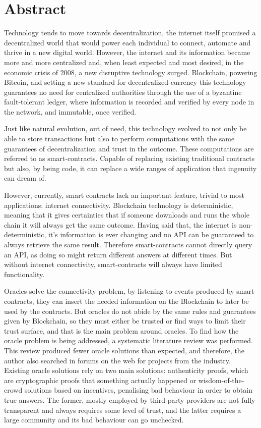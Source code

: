 \chapter*{Abstract}

Technology tends to move towards decentralization, the internet itself promised a decentralized world that would power each individual to connect, automate and thrive in a new digital world. However, the internet and its information became more and more centralized and, when least expected and most desired, in the economic crisis of 2008, a new disruptive technology surged. Blockchain, powering Bitcoin, and setting a new standard for decentralized-currency this technology guarantees no need for centralized authorities through the use of a byzantine fault-tolerant ledger, where information is recorded and verified by every node in the network, and immutable, once verified.

Just like natural evolution, out of need, this technology evolved to not only be able to store transactions but also to perform computations with the same guarantees of decentralization and trust in the outcome. These computations are referred to as smart-contracts. Capable of replacing existing traditional contracts but also, by being code, it can replace a wide ranges of application that ingenuity can dream of.

However, currently, smart contracts lack an important feature, trivial to most applications: internet connectivity. Blockchain technology is deterministic, meaning that it gives certainties that if someone downloads and runs the whole chain it will always get the same outcome. Having said that, the internet is non-deterministic, it's information is ever changing and no API can be guaranteed to always retrieve the same result. Therefore smart-contracts cannot directly query an API, as doing so might return different answers at different times. But without internet connectivity, smart-contracts will always have limited functionality.

Oracles solve the connectivity problem, by listening to events produced by smart-contracts, they can insert the needed information on the Blockchain to later be used by the contracts. But oracles do not abide by the same rules and guarantees given by Blockchain, so they must either be trusted or find ways to limit their trust surface, and that is the main problem around oracles. To find how the oracle problem is being addressed, a systematic literature review was performed. This review produced fewer oracle solutions than expected, and therefore, the author also searched in forums on the web for projects from the industry. Existing oracle solutions rely on two main solutions: authenticity proofs, which are cryptographic proofs that something actually happened or wisdom-of-the-crowd solutions based on incentives, penalising bad behaviour in order to obtain true answers. The former, mostly employed by third-party providers are not fully transparent and always requires some level of trust, and the latter requires a large community and its bad behaviour can go unchecked.

